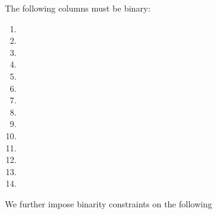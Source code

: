The following columns must be binary:
\begin{multicols}{2}
    \begin{enumerate}
        \item \isBlsGOneAddData             
        \item \isBlsGOneAddResult           
             
        \item \isBlsGOneMsmData             
        \item \isBlsGOneMsmResult 

        \item \isBlsGTwoAddData             
        \item \isBlsGTwoAddResult   

        \item \isBlsGTwoMsmData
        \item \isBlsGTwoMsmResult

        \item \isBlsPairingCheckData
        \item \isBlsPairingCheckResult          
      
        \item \isBlsMapFpToGOneData         
        \item \isBlsMapFpToGOneResult       
      
        \item \isBlsMapFpTwoToGTwoData         
        \item \isBlsMapFpTwoToGTwoResult     
    \end{enumerate}
\end{multicols}
\noindent We further impose binarity constraints on the following

